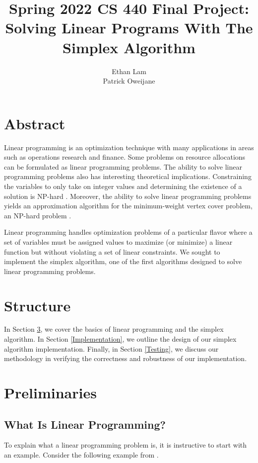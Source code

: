 \documentclass{article}
\title{Spring 2022 CS 440 Final Project: Solving Linear Programs With The Simplex Algorithm}
\author{Ethan Lam \\ Patrick Oweijane}
\date{}
\begin{document}
\maketitle
\tableofcontents

\section{Abstract}
Linear programming is an optimization technique with many applications in areas such as operations research and finance. Some problems on resource allocations can be formulated as linear programming problems. The ability to solve linear programming problems also has interesting theoretical implications. Constraining the variables to only take on integer values and determining the existence of a solution is NP-hard \cite{CLRS}. Moreover, the ability to solve linear programming problems yields an approximation algorithm for the minimum-weight vertex cover problem, an NP-hard problem \cite{CLRS}.

Linear programming handles optimization problems of a particular flavor where a set of variables must be assigned values to maximize (or minimize) a linear function but without violating a set of linear constraints. We sought to implement the simplex algorithm, one of the first algorithms designed to solve linear programming problems. 

\section{Structure}
In Section \ref{Preliminaries}, we cover the basics of linear programming and the simplex algorithm. In Section \ref{Implementation}, we outline the design of our simplex algorithm implementation. Finally, in Section \ref{Testing}, we discuss our methodology in verifying the correctness and robustness of our implementation.

\section{Preliminaries} \label{Preliminaries}
\subsection{What Is Linear Programming?}
To explain what a linear programming problem is, it is instructive to start with an example. Consider the following example from \cite{finitebook}.
\end{document}
